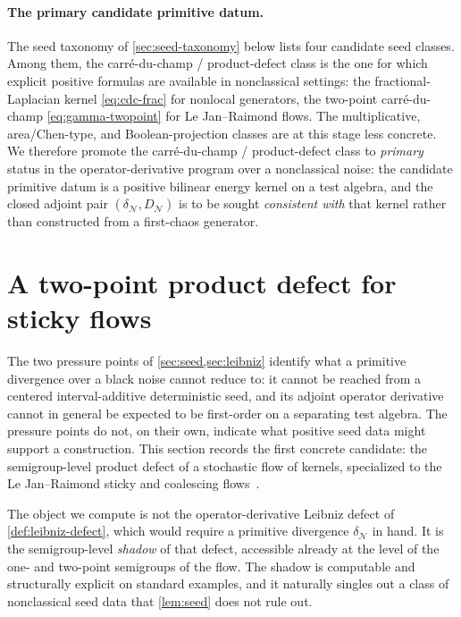 \documentclass[11pt,reqno]{amsart}
\theoremstyle{plain}
\theoremstyle{definition}
\theoremstyle{remark}
\begin{document}
\paragraph{The primary candidate primitive datum.}
The seed taxonomy of \cref{sec:seed-taxonomy} below lists four
candidate seed classes. Among them, the carr\'e-du-champ /
product-defect class is the one for which explicit positive formulas
are available in nonclassical settings: the fractional-Laplacian
kernel \eqref{eq:cdc-frac} for nonlocal generators, the two-point
carr\'e-du-champ \eqref{eq:gamma-twopoint} for Le Jan--Raimond
flows. The multiplicative, area/Chen-type, and Boolean-projection
classes are at this stage less concrete. We therefore promote the
carr\'e-du-champ / product-defect class to \emph{primary} status in
the operator-derivative program over a nonclassical noise: the
candidate primitive datum is a positive bilinear energy kernel on a
test algebra, and the closed adjoint pair
$(\delta_{\mathcal N},D_{\mathcal N})$ is to be sought
\emph{consistent with} that kernel rather than constructed from a
first-chaos generator.

\section{A two-point product defect for sticky flows}\label{sec:twopoint}

The two pressure points of \cref{sec:seed,sec:leibniz} identify what
a primitive divergence over a black noise cannot reduce to: it
cannot be reached from a centered interval-additive deterministic
seed, and its adjoint operator derivative cannot in general be
expected to be first-order on a separating test algebra. The
pressure points do not, on their own, indicate what positive seed
data might support a construction. This section records the first
concrete candidate: the semigroup-level product defect of a
stochastic flow of kernels, specialized to the Le Jan--Raimond
sticky and coalescing flows~\cite{LeJanRaimond2004}.

The object we compute is not the operator-derivative Leibniz defect
of \cref{def:leibniz-defect}, which would require a primitive
divergence $\delta_{\mathcal N}$ in hand. It is the
semigroup-level \emph{shadow} of that defect, accessible already at
the level of the one- and two-point semigroups of the flow. The
shadow is computable and structurally explicit on standard
examples, and it naturally singles out a class of nonclassical seed
data that \cref{lem:seed} does not rule out.
\end{document}
